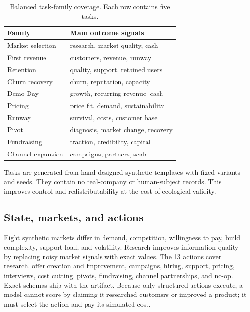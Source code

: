 \documentclass[sigconf,review]{acmart}
\begin{document}
\begin{table}[t]
\caption{Balanced task-family coverage. Each row contains five tasks.}
\label{tab:families}
\centering\small
\begin{tabular}{ll}
\toprule
Family & Main outcome signals \\
\midrule
Market selection & research, market quality, cash \\
First revenue & customers, revenue, runway \\
Retention & quality, support, retained users \\
Churn recovery & churn, reputation, capacity \\
Demo Day & growth, recurring revenue, cash \\
Pricing & price fit, demand, sustainability \\
Runway & survival, costs, customer base \\
Pivot & diagnosis, market change, recovery \\
Fundraising & traction, credibility, capital \\
Channel expansion & campaigns, partners, scale \\
\bottomrule
\end{tabular}
\end{table}

Tasks are generated from hand-designed synthetic templates with fixed variants and seeds.
They contain no real-company or human-subject records.
This improves control and redistributability at the cost of ecological validity.

\subsection{State, markets, and actions}
Eight synthetic markets differ in demand, competition, willingness to pay, build complexity, support load, and volatility.
Research improves information quality by replacing noisy market signals with exact values.
The 13 actions cover research, offer creation and improvement, campaigns, hiring, support, pricing, interviews, cost cutting, pivots, fundraising, channel partnerships, and no-op.
Exact schemas ship with the artifact.
Because only structured actions execute, a model cannot score by claiming it researched customers or improved a product; it must select the action and pay its simulated cost.
\end{document}
